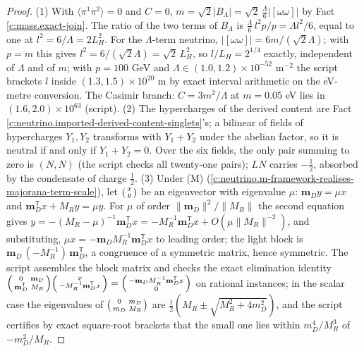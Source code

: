 \documentclass[11pt]{article}
\theoremstyle{definition}
\theoremstyle{plain}
\providecommand{\LH}{}\renewcommand{\LH}{L_{H}}
\providecommand{\mD}{}\renewcommand{\mD}{\mathbf{m}_{D}}
\providecommand{\br}{}\renewcommand{\br}[1]{\langle #1\rangle}
\begin{document}
\begin{proof}
(1) With $\br{\pi^{1}\pi^{2}} = 0$ and $C = 0$, $m = \sqrt{2}|B_{\Lambda}| = \sqrt{2}\,\tfrac{\Lambda}{6}|[\omega\omega]|$ by Fact \ref{c:mass.exact-join}. The ratio of the two terms of $B_{\Lambda}$ is $\tfrac{\Lambda}{6}\,l^{2}p/p = \Lambda l^{2}/6$, equal to one at $l^{2} = 6/\Lambda = 2\LH^{2}$. For the $\Lambda$-term neutrino, $|[\omega\omega]| = 6m/(\sqrt{2}\Lambda)$; with $p = m$ this gives $l^{2} = 6/(\sqrt{2}\Lambda) = \sqrt{2}\,\LH^{2}$, so $l/\LH = 2^{1/4}$ exactly, independent of $\Lambda$ and of $m$; with $p = 100$ GeV and $\Lambda \in (1.0, 1.2) \times 10^{-52}$ m$^{-2}$ \cite{PDG2024} the script brackets $l$ inside $(1.3, 1.5) \times 10^{20}$ m by exact interval arithmetic on the eV-metre conversion. The Casimir branch: $C = 3m^{2}/\Lambda$ at $m = 0.05$ eV lies in $(1.6, 2.0) \times 10^{63}$ (script). (2) The hypercharges of the derived content are Fact \ref{c:neutrino.imported-derived-content-singlets}'s; a bilinear of fields of hypercharges $Y_{1}, Y_{2}$ transforms with $Y_{1} + Y_{2}$ under the abelian factor, so it is neutral if and only if $Y_{1} + Y_{2} = 0$. Over the six fields, the only pair summing to zero is $(N, N)$ (the script checks all twenty-one pairs); $L N$ carries $-\tfrac12$, absorbed by the condensate of charge $\tfrac12$. (3) Under (M) (\ref{c:neutrino.m-framework-realises-majorana-term-scale}), let $\begin{psmallmatrix} x \\ y \end{psmallmatrix}$ be an eigenvector with eigenvalue $\mu$: $\mD y = \mu x$ and $\mD^{\mathsf{T}}x + M_{R}y = \mu y$. For $\mu$ of order $\|\mD\|^{2}/\|M_{R}\|$ the second equation gives $y = -(M_{R} - \mu)^{-1}\mD^{\mathsf{T}}x = -M_{R}^{-1}\mD^{\mathsf{T}}x + O(\mu\|M_{R}\|^{-2})$, and substituting, $\mu x = -\mD M_{R}^{-1}\mD^{\mathsf{T}}x$ to leading order; the light block is $\mD\,(-M_{R}^{-1})\,\mD^{\mathsf{T}}$, a congruence of a symmetric matrix, hence symmetric. The script assembles the block matrix and checks the exact elimination identity $\begin{psmallmatrix} 0 & \mD \\ \mD^{\mathsf{T}} & M_{R}\end{psmallmatrix}\begin{psmallmatrix} x \\ -M_{R}^{-1}\mD^{\mathsf{T}}x\end{psmallmatrix} = \begin{psmallmatrix} -\mD M_{R}^{-1}\mD^{\mathsf{T}}x \\ 0\end{psmallmatrix}$ on rational instances; in the scalar case the eigenvalues of $\begin{psmallmatrix} 0 & m_{D} \\ m_{D} & M_{R}\end{psmallmatrix}$ are $\tfrac12(M_{R} \pm \sqrt{M_{R}^{2} + 4m_{D}^{2}})$, and the script certifies by exact square-root brackets that the small one lies within $m_{D}^{4}/M_{R}^{3}$ of $-m_{D}^{2}/M_{R}$.

\end{proof}
\end{document}
